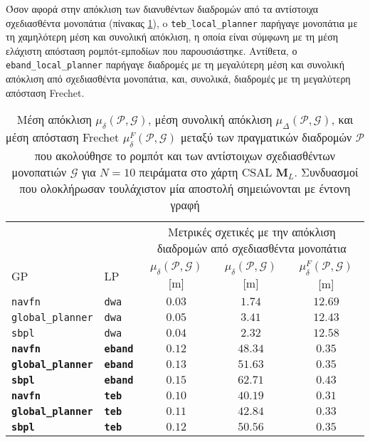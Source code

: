 Όσον αφορά στην απόκλιση των διανυθέντων διαδρομών από τα αντίστοιχα
σχεδιασθέντα μονοπάτια (πίνακας
\ref{tbl:info_deviation_from_global_plan_csal}), o \texttt{teb\_local\_planner}
παρήγαγε μονοπάτια με τη χαμηλότερη μέση και συνολική απόκλιση, η οποία είναι
σύμφωνη με τη μέση ελάχιστη απόσταση ρομπότ-εμποδίων που παρουσιάστηκε.
Αντίθετα, ο \texttt{eband\_local\_planner} παρήγαγε διαδρομές με τη μεγαλύτερη
μέση και συνολική απόκλιση από σχεδιασθέντα μονοπάτια, και, συνολικά, διαδρομές
με τη μεγαλύτερη απόσταση Frechet.

\begin{table}[h]
\renewcommand{\arraystretch}{1.3}
\begin{tabular}{llccc}
& & \multicolumn{3}{c}{Μετρικές σχετικές με την απόκλιση διαδρομών από σχεδιασθέντα μονοπάτια} \\
\cline{3-5}
  GP & LP & $\mu_{\delta}(\bm{\mathcal{P}},\bm{\mathcal{G}})$ [m] & $\mu_{\delta}(\bm{\mathcal{P}},\bm{\mathcal{G}})$ [m] & $\mu_{\delta}^F(\bm{\mathcal{P}},\bm{\mathcal{G}})$ [m] \\ \toprule
  \texttt{navfn} & \texttt{dwa} & $0.03$ & $1.74$ & $12.69$ \\
  \texttt{global\_planner} & \texttt{dwa} & $0.05$ & $3.41$ & $12.43$ \\
  \texttt{sbpl} & \texttt{dwa} & $0.04$ & $2.32$ & $12.58$ \\
  \textbf{\texttt{navfn}} & \textbf{\texttt{eband}} & $\bm{0.12}$ & $\bm{48.34}$ & $\bm{0.35}$ \\
  \textbf{\texttt{global\_planner}} & \textbf{\texttt{eband}} & $\bm{0.13}$ & $\bm{51.63}$ & $\bm{0.35}$ \\
  \textbf{\texttt{sbpl}} & \textbf{\texttt{eband}} & $\bm{0.15}$ & $\bm{62.71}$ & $\bm{0.43}$ \\
  \textbf{\texttt{navfn}} & \textbf{\texttt{teb}} & $\bm{0.10}$ & $\bm{40.19}$ & $\bm{0.31}$ \\
  \textbf{\texttt{global\_planner}} & \textbf{\texttt{teb}} & $\bm{0.11}$ & $\bm{42.84}$ & $\bm{0.33}$ \\
  \textbf{\texttt{sbpl}} & \textbf{\texttt{teb}} & $\bm{0.12}$ & $\bm{50.56}$ & $\bm{0.35}$ \\ \bottomrule
\end{tabular}
\caption{\small Μέση απόκλιση $\mu_{\delta}(\bm{\mathcal{P}},\bm{\mathcal{G}})$,
         μέση συνολική απόκλιση
         $\mu_{\Delta}(\bm{\mathcal{P}},\bm{\mathcal{G}})$, και μέση απόσταση
         Frechet $\mu_{\delta}^F(\bm{\mathcal{P}},\bm{\mathcal{G}})$ μεταξύ των
         πραγματικών διαδρομών $\bm{\mathcal{P}}$ που ακολούθησε το ρομπότ και
         των αντίστοιχων σχεδιασθέντων μονοπατιών $\bm{\mathcal{G}}$ για $N=10$
         πειράματα στο χάρτη CSAL $\bm{M}_L$. Συνδυασμοί που
         ολοκλήρωσαν τουλάχιστον μία αποστολή σημειώνονται με έντονη γραφή}
\label{tbl:info_deviation_from_global_plan_csal}
\end{table}
